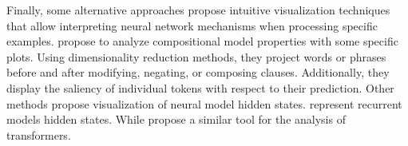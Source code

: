 Finally, some alternative approaches propose intuitive visualization techniques that allow interpreting neural network mechanisms when processing specific examples. \textcite{li_16} propose to analyze compositional model properties with some specific plots. Using dimensionality reduction methods, they project words or phrases before and after modifying, negating, or composing clauses. Additionally, they display the saliency of individual tokens with respect to their prediction. Other methods propose visualization of neural model hidden states. \textcite{strobelt_18} represent recurrent models hidden states. While \textcite{hoover_19} propose a similar tool for the analysis of transformers.
